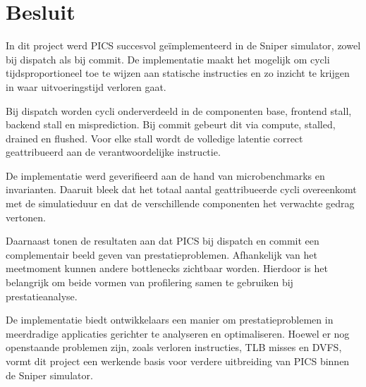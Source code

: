 \documentclass[12pt,a4paper,faculty=ea,language=nl]{ugent-doc}
\begin{document}
\section{Besluit}

In dit project werd PICS succesvol geïmplementeerd in de Sniper simulator, zowel bij dispatch als bij commit. De implementatie maakt het mogelijk om cycli tijdsproportioneel toe te wijzen aan statische instructies en zo inzicht te krijgen in waar uitvoeringstijd verloren gaat.

Bij dispatch worden cycli onderverdeeld in de componenten base, frontend stall, backend stall en misprediction. Bij commit gebeurt dit via compute, stalled, drained en flushed. Voor elke stall wordt de volledige latentie correct geattribueerd aan de verantwoordelijke instructie.

De implementatie werd geverifieerd aan de hand van microbenchmarks en invarianten. Daaruit bleek dat het totaal aantal geattribueerde cycli overeenkomt met de simulatieduur en dat de verschillende componenten het verwachte gedrag vertonen.

Daarnaast tonen de resultaten aan dat PICS bij dispatch en commit een complementair beeld geven van prestatieproblemen. Afhankelijk van het meetmoment kunnen andere bottlenecks zichtbaar worden. Hierdoor is het belangrijk om beide vormen van profilering samen te gebruiken bij prestatieanalyse.

De implementatie biedt ontwikkelaars een manier om prestatieproblemen in meerdradige applicaties gerichter te analyseren en optimaliseren. Hoewel er nog openstaande problemen zijn, zoals verloren instructies, TLB misses en DVFS, vormt dit project een werkende basis voor verdere uitbreiding van PICS binnen de Sniper simulator.

\newpage
\end{document}

